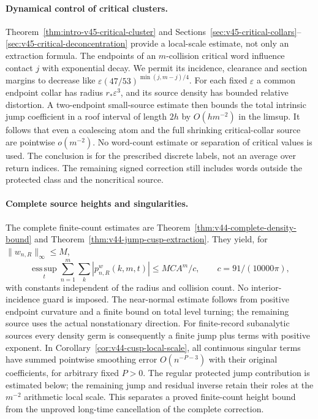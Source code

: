 \documentclass[11pt,reqno]{amsart}
\numberwithin{equation}{section}
\theoremstyle{definition}\newtheorem{definition}[theorem]{Definition}
\theoremstyle{remark}\newtheorem{remark}[theorem]{Remark}
\begin{document}
\maketitle
\enlargethispage{3pt}

\paragraph{Dynamical control of critical clusters.}
Theorem~\ref{thm:intro-v45-critical-cluster} and
Sections~\ref{sec:v45-critical-collars}--\ref{sec:v45-critical-deconcentration}
provide a local-scale estimate, not only an extraction formula.
The endpoints of an $m$-collision critical word influence contact $j$
with exponential decay. We permit its incidence, clearance and section
margins to decrease like $\varepsilon(47/53)^{\min(j,m-j)/4}$.
For each fixed $\varepsilon$ a common endpoint collar has radius
$r_*\varepsilon^3$, and its source density has bounded relative
distortion. A two-endpoint small-source estimate then bounds the total
intrinsic jump coefficient in a roof interval of length $2h$ by
$O(hm^{-2})$ in the limsup. It follows that even a coalescing atom and
the full shrinking critical-collar source are pointwise $o(m^{-2})$.
No word-count estimate or separation of critical values is used. The
conclusion is for the prescribed discrete labels, not an average over
return indices. The remaining signed correction still includes words
outside the protected class and the noncritical source.

\paragraph{Complete source heights and singularities.}
The complete finite-count estimates are Theorem~\ref{thm:v44-complete-density-bound}
and Theorem~\ref{thm:v44-jump-cusp-extraction}. They yield, for
$\|w_{n,R}\|_\infty\le M$,
\[
 \operatorname*{ess\,sup}_{t}\sum_{n=1}^m\sum_k
       |p^w_{n,R}(k,m,t)|\le MCA^m/c,
 \qquad c=91/(10000\pi),
\]
with constants independent of the radius and collision count. No
interior-incidence guard is imposed. The near-normal estimate follows
from positive endpoint curvature and a finite bound on total level
turning; the remaining source uses the actual nonstationary direction.
For finite-record subanalytic sources every density germ is consequently
a finite jump plus terms with positive exponent. In
Corollary~\ref{cor:v44-cusp-local-scale}, all continuous singular terms
have summed pointwise smoothing error $O(n^{-P-3})$ with their original
coefficients, for arbitrary fixed $P>0$. The regular protected jump contribution is estimated below; the
remaining jump and residual inverse retain their roles at the
$m^{-2}$ arithmetic local scale.
This separates a proved finite-count height bound from the unproved
long-time cancellation of the complete correction.
\end{document}
